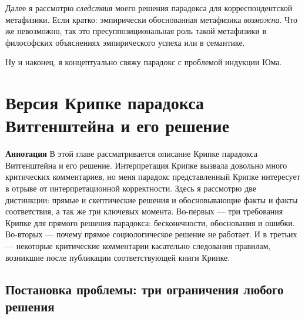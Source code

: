 \documentclass[11pt]{book}
\begin{document}
Далее я рассмотрю \textit{следствия} моего решения парадокса для корреспондентской метафизики. Если кратко: эмпирически обоснованная метафизика \textit{возможна}. Что же невозможно, так это пресуппозициональная роль такой метафизики в философских объяснениях эмпирического успеха или в семантике.

Ну и наконец, я концептуально свяжу парадокс с проблемой индукции Юма.

\chapter{Версия Крипке парадокса Витгенштейна и его решение}

\qquad

\textbf{Аннотация} \quad В этой главе рассматривается описание Крипке парадокса Витгенштейна и его решение. Интерпретация Крипке вызвала довольно много критических комментариев, но меня парадокс представленный Крипке интересует в отрыве от интерпретационной корректности. Здесь я рассмотрю две дистинкции: прямые и скептические решения и обосновывающие факты и факты соответствия, а так же три ключевых момента. Во-первых --- три требования Крипке для прямого решения парадокса: бесконечности, обоснования и ошибки. Во-вторых --- почему прямое социологическое решение не работает. И в третьих --- некоторые критические комментарии касательно следования правилам, возникшие после публикации соответствующей книги Крипке.

\qquad

\section{Постановка проблемы: три ограничения любого решения}
\end{document}
